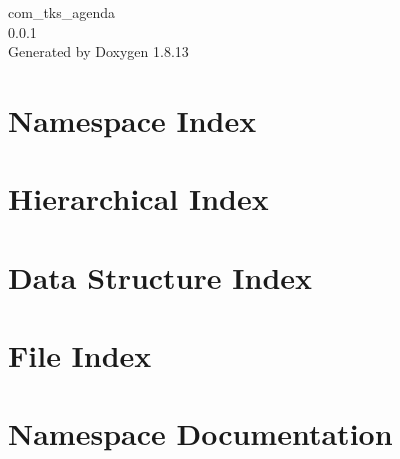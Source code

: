 \documentclass[twoside]{book}
\newcommand{\+}{\discretionary{\mbox{\scriptsize$\hookleftarrow$}}{}{}}
\newcommand{\clearemptydoublepage}{%
  \newpage{\pagestyle{empty}\cleardoublepage}%
}
\begin{document}
\begin{titlepage}
\vspace*{7cm}
\begin{center}%
{\Large com\+\_\+tks\+\_\+agenda \\[1ex]\large 0.\+0.\+1 }\\
\vspace*{1cm}
{\large Generated by Doxygen 1.8.13}\\
\end{center}
\end{titlepage}
\clearemptydoublepage
{}
\tableofcontents
\clearemptydoublepage
{}

\chapter{Namespace Index}

\chapter{Hierarchical Index}

\chapter{Data Structure Index}

\chapter{File Index}

\chapter{Namespace Documentation}





\end{document}
